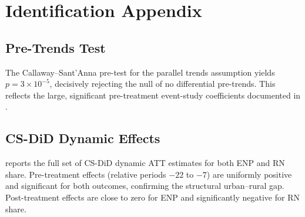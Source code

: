\documentclass[12pt]{article}
\begin{document}
\section{Identification Appendix}
\label{app:identification}

\subsection{Pre-Trends Test}

The Callaway--Sant'Anna pre-test for the parallel trends assumption yields $p = 3 \times 10^{-5}$, decisively rejecting the null of no differential pre-trends. This reflects the large, significant pre-treatment event-study coefficients documented in .

\subsection{CS-DiD Dynamic Effects}

 reports the full set of CS-DiD dynamic ATT estimates for both ENP and RN share. Pre-treatment effects (relative periods $-22$ to $-7$) are uniformly positive and significant for both outcomes, confirming the structural urban--rural gap. Post-treatment effects are close to zero for ENP and significantly negative for RN share.
\end{document}
